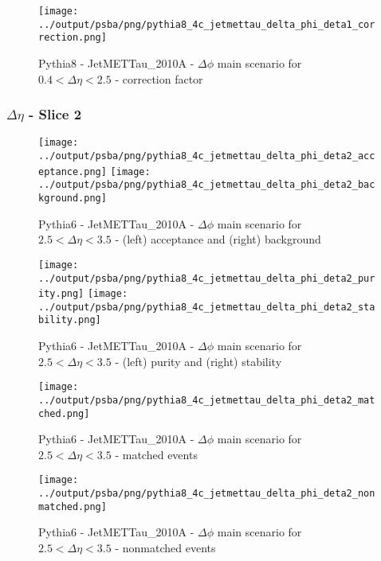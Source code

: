 \documentclass[11pt]{book}
\begin{document}
\begin{figure}[ht]
\centering
\texttt{[image: ../output/psba/png/pythia8\_4c\_jetmettau\_delta\_phi\_deta1\_correction.png]}
\caption{Pythia8 - JetMETTau\_2010A - $\Delta\phi$ main scenario for $0.4 < \Delta\eta < 2.5$ - correction factor}
\label{fig:p8_jetmettau_delta_phi_deta1_correction}
\end{figure}

\clearpage
\subsubsection{$\Delta\eta$ - Slice 2}

\begin{figure}[ht]
\centering
\texttt{[image: ../output/psba/png/pythia8\_4c\_jetmettau\_delta\_phi\_deta2\_acceptance.png]}
\texttt{[image: ../output/psba/png/pythia8\_4c\_jetmettau\_delta\_phi\_deta2\_background.png]}
\caption{Pythia6 - JetMETTau\_2010A - $\Delta\phi$ main scenario for $2.5 < \Delta\eta < 3.5$ - (left) acceptance and (right) background}
\label{fig:p6_jetmettau_delta_phi_deta2_ab}
\end{figure}

\begin{figure}[ht]
\centering
\texttt{[image: ../output/psba/png/pythia8\_4c\_jetmettau\_delta\_phi\_deta2\_purity.png]}
\texttt{[image: ../output/psba/png/pythia8\_4c\_jetmettau\_delta\_phi\_deta2\_stability.png]}
\caption{Pythia6 - JetMETTau\_2010A - $\Delta\phi$ main scenario for $2.5 < \Delta\eta < 3.5$ - (left) purity and (right) stability}
\label{fig:p6_jetmettau_delta_phi_deta2_ps}
\end{figure}

\begin{figure}[ht]
\centering
\texttt{[image: ../output/psba/png/pythia8\_4c\_jetmettau\_delta\_phi\_deta2\_matched.png]}
\caption{Pythia6 - JetMETTau\_2010A - $\Delta\phi$ main scenario for $2.5 < \Delta\eta < 3.5$ - matched events}
\label{fig:p6_jetmettau_delta_phi_deta2_matched}
\end{figure}

\begin{figure}[ht]
\centering
\texttt{[image: ../output/psba/png/pythia8\_4c\_jetmettau\_delta\_phi\_deta2\_nonmatched.png]}
\caption{Pythia6 - JetMETTau\_2010A - $\Delta\phi$ main scenario for $2.5 < \Delta\eta < 3.5$ - nonmatched events}
\label{fig:p6_jetmettau_delta_phi_deta2_nonmatched}
\end{figure}
\end{document}

